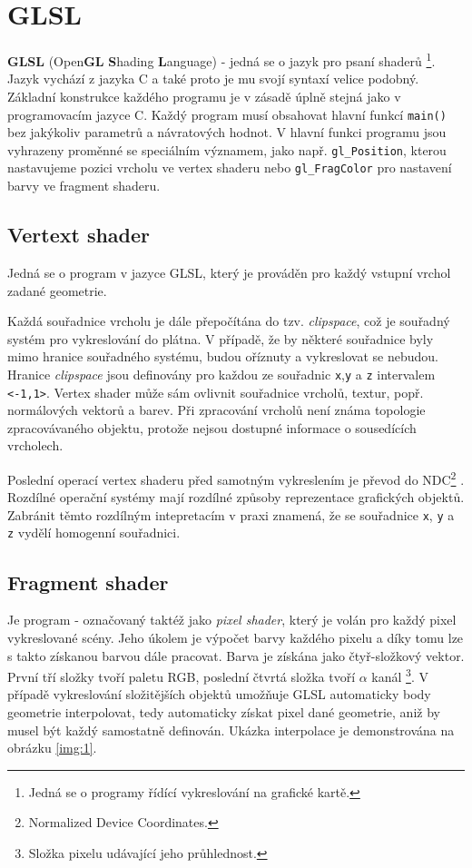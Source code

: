 \newpage

\section{GLSL}
\textbf{GLSL} (Open\textbf{GL} \textbf{S}hading \textbf{L}anguage) - jedná se o jazyk pro psaní shaderů \footnote{Jedná se o programy řídící vykreslování na grafické kartě.}. Jazyk vychází z jazyka C a také proto je mu svojí syntaxí velice podobný. Základní konstrukce každého programu je v zásadě úplně stejná jako v programovacím jazyce C. Každý program musí obsahovat hlavní funkcí \texttt{main()} bez jakýkoliv parametrů a návratových hodnot. V hlavní funkci programu jsou vyhrazeny proměnné se speciálním významem, jako např. \texttt{gl\_Position}, kterou nastavujeme  pozici vrcholu ve vertex shaderu nebo \texttt{gl\_FragColor} pro nastavení barvy ve fragment shaderu.

\subsection{Vertext shader}
Jedná se o program v jazyce GLSL, který je prováděn pro každý vstupní vrchol zadané geometrie. 

Každá souřadnice vrcholu je dále přepočítána do tzv. \textit{clipspace}, což je souřadný systém pro vykreslování do plátna. V případě, že by některé souřadnice byly mimo hranice souřadného systému, budou oříznuty a vykreslovat se nebudou. Hranice \textit{clipspace} jsou definovány pro každou ze souřadnic \texttt{x},\texttt{y} a \texttt{z} intervalem \texttt{<-1,1>}. Vertex shader může sám ovlivnit souřadnice vrcholů, textur, popř. normálových vektorů a barev. Při zpracování vrcholů není známa topologie zpracovávaného objektu, protože nejsou dostupné informace o sousedících vrcholech. 

Poslední operací vertex shaderu před samotným vykreslením je převod do NDC\footnote{Normalized Device Coordinates.} \cite{opengl}. Rozdílné operační systémy mají rozdílné způsoby reprezentace grafických objektů. Zabránit těmto rozdílným  intepretacím v praxi znamená, že se souřadnice \texttt{x}, \texttt{y} a \texttt{z} vydělí homogenní souřadnici.

\subsection{Fragment shader}
Je program - označovaný taktéž jako \textit{pixel shader}, který je volán pro každý pixel vykreslované scény. Jeho úkolem je výpočet barvy každého pixelu a díky tomu lze s takto získanou barvou  dále pracovat. Barva je získána jako čtyř-složkový vektor. První tří složky tvoří paletu RGB, poslední čtvrtá složka tvoří $\alpha$ kanál \footnote{Složka pixelu udávající jeho průhlednost.}. V případě vykreslování složitějších objektů umožňuje GLSL automaticky body geometrie interpolovat, tedy automaticky získat pixel dané geometrie, aniž by musel být každý samostatně definován. Ukázka interpolace je demonstrována na obrázku \ref{img:1}.


